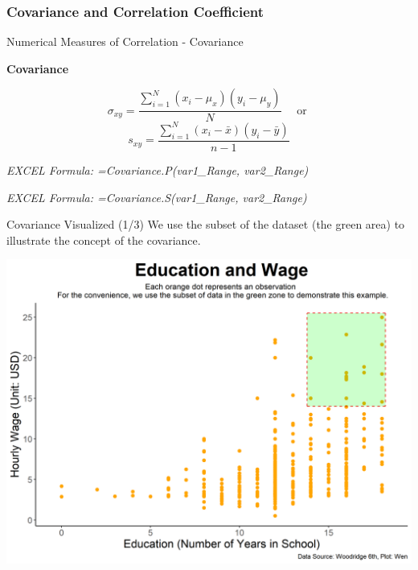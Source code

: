 \documentclass{beamer}
\begin{document}
\subsubsection{Covariance and Correlation Coefficient}
\begin{frame}{Numerical Measures of Correlation - Covariance}

\textbf{Covariance}

$$ \sigma_{xy} = \frac{\sum_{i=1}^{N}(x_i - \mu_x)(y_i - \mu_y)}{{N}} \quad\text{ or } $$
$$ s_{xy} = \frac{\sum_{i=1}^{N}(x_i - \bar{x})(y_i - \bar{y})}{{n - 1}} $$

\begin{flushright}
\textit{EXCEL Formula: =Covariance.P(var1\_Range, var2\_Range)}

\textit{EXCEL Formula: =Covariance.S(var1\_Range, var2\_Range)}
\end{flushright}


\end{frame}





\begin{frame}{Covariance Visualized (1/3)}
\vspace{0.2 cm}
We use the subset of the dataset (the green area) to illustrate the concept of the covariance.
\begin{center}
\includegraphics[scale=0.45]{images/plot0.png}
\end{center}

\end{frame}
\end{document}
